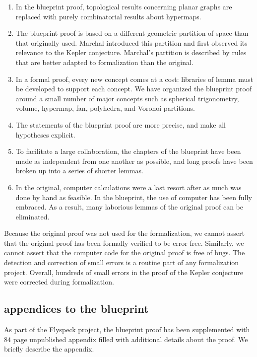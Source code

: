 \begin{enumerate}
\item In the blueprint proof, topological results concerning planar
  graphs are replaced with purely combinatorial results about
  hypermaps.  
\item The blueprint proof is based on a different geometric partition
  of space than that originally used.  Marchal introduced this
  partition and first observed its relevance to the Kepler conjecture.
 Marchal's partition is described by 
   rules that are better adapted to formalization than the original.
 \item In a formal proof, every new concept comes at a cost: libraries
   of lemma must be developed to support each concept.  We have
   organized the blueprint proof around a small number of major
   concepts such as spherical trigonometry, volume, hypermap, fan,
   polyhedra, and Voronoi partitions.
 \item The statements of the blueprint proof are more precise, and
   make all hypotheses explicit.
 \item To facilitate a large collaboration, the chapters of the
   blueprint have been made as independent from one another as
   possible, and long proofs have been broken up into a series of
   shorter lemmas.
\item In
  the original, computer calculations were a last resort after
  as much was done by hand as feasible.
  In the
  blueprint, the use of computer has been fully embraced.  As a
  result, many laborious lemmas of the original proof can be
  eliminated.
\end{enumerate}


Because the original proof was not used for the formalization, we
cannot assert that the original proof has been formally verified to be
error free.  Similarly, we cannot assert that the computer code for
the original proof is free of bugs.  The detection and correction of
small errors is a routine part of any formalization project.  Overall,
hundreds of small errors in the proof of the Kepler conjecture were
corrected during formalization.  

\subsection{appendices to the blueprint}

As part of the Flyspeck project, the blueprint proof has been
supplemented with $84$ page unpublished appendix filled with
additional details about the proof.   We briefly describe the
appendix.

